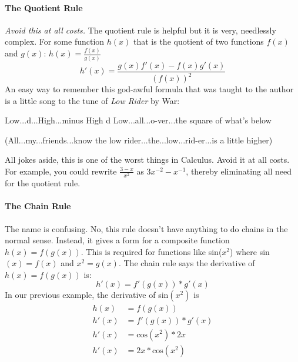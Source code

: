 \documentclass[../revisedmain.tex]{subfiles}
\begin{document}
\paragraph{The Quotient Rule} \textit{Avoid this at all costs.} The quotient rule is helpful but it is very, needlessly complex. For some function $h(x)$ that is the quotient of two functions $f(x)$ and $g(x)$: $h(x)=\displaystyle\frac{f(x)}{g(x)}$$$h'(x)=\frac{g(x)f'(x)-f(x)g'(x)}{(f(x))^2}$$ An easy way to remember this god-awful formula that was taught to the author is a little song to the tune of \textit{Low Rider} by War:
\begin{displayquote}
	Low...d...High...minus High d Low...all...o-ver...the square of what's below 
\end{displayquote}
\begin{displayquote}
	(All...my...friends...know the low rider...the...low...rid-er...is a little higher)
\end{displayquote}
All jokes aside, this is one of the worst things in Calculus. Avoid it at all costs. For example, you could rewrite $\displaystyle\frac{3-x}{x^2}$ as $3x^{-2}-x^{-1}$, thereby eliminating all need for the quotient rule.
\paragraph{The Chain Rule} The name is confusing. No, this rule doesn't have anything to do chains in the normal sense. Instead, it gives a form for a composite function $h(x)=f(g(x))$. This is required for functions like sin($x^2$) where sin$(x)=f(x)$ and $x^2=g(x)$. The chain rule says the derivative of $h(x)=f(g(x))$ is:$$h'(x)=f'(g(x))*g'(x)$$In our previous example, the derivative of sin$(x^2)$ is
\begin{equation}
\begin{split}
h(x) &= f(g(x)) \\
h'(x) &= f'(g(x))*g'(x) \\
h'(x) &= \text{cos}(x^2)*2x \\
h'(x) &= 2x*\text{cos}(x^2)
\end{split}
\end{equation}
\end{document}
